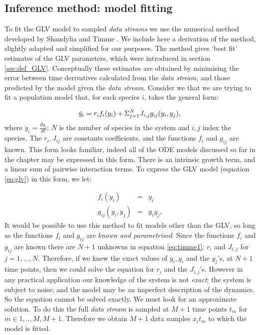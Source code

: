 \subsection{Inference method: model fitting}
\label{sec:timme}


To fit the GLV model to sampled \emph{data streams} we use the numerical method developed by Shandylia and Timme \cite{shandilya2011inferring}. We include here a derivation of the method, slightly adapted and simplified for our purposes. The method gives `best fit' estimates of the GLV parameters, which were introduced in section \ref{sec:def_GLV}. Conceptually these estimates are obtained by minimising the error between time derivatives calculated from the \emph{data stream}, and those predicted by the model given the \emph{data stream}. Consider we that we are trying to fit a population model that, for each species $i$, takes the general form:

\begin{equation}\label{eq:timme1}
 \dot{y}_i = r_if_i(y_i) + \Sigma_{j=1}^{N}J_{i,j}g_{ij}(y_i,y_j),\\
\end{equation}
%
where $\dot{y}_i = \frac{dy_{i}}{dt}$; $N$ is the number of species in the system and $i,j$ index the species. The $r_i, J_{ij}$ are constants coefficients, and the functions $f_i$ and $g_{ij}$ are known. This form looks familiar, indeed all of the ODE models discussed so far in the chapter may be expressed in this form. There is an intrinsic growth term, and a linear sum of pairwise interaction terms. To express the GLV model (equation \ref{eq:glv}) in this form, we let:

\begin{eqnarray}
f_i(y_i) &=& y_i \\
g_{ij}(y_i,y_j) &=& y_iy_j, 
\end{eqnarray}
%
It would be possible to use this method to fit models other than the GLV, so long as the functions $f_i$ and $g_{ij}$ are \emph{known and parametrised}. Since the functions $f_i$ and $g_{ij}$ are known there are $N+1$ unknowns in equation \ref{eq:timme1}: $r_i$ and $J_{i,j}$ for $j=1,...,N$. Therefore, if we knew the exact values of $\dot{y_i},y_i$ and the $y_j$'s, at $N+1$ time points, then we could solve the equation for $r_i$ and the $J_{i,j}$'s. However in any practical application our knowledge of the system is not \emph{exact}; the system is subject to noise; and the model may be an imperfect description of the dynamics. So the equation cannot be solved exactly. We must look for an approximate solution. To do this the full \emph{data stream} is sampled at $M+1$ time points $t_m$ for $m \in {1,..,M,M+1}$. Therefore we obtain $M+1$ data samples $x_i{t_m}$ to which the model is fitted. 

